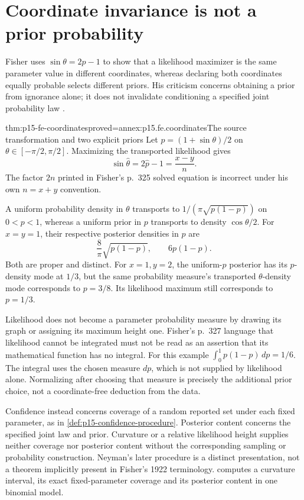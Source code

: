 \section{Coordinate invariance is not a prior probability}

Fisher uses \(\sin\theta=2p-1\) to show that a likelihood
maximizer is the same parameter value in different coordinates, whereas
declaring both coordinates equally probable selects different priors.
His criticism concerns obtaining a prior from ignorance alone; it does
not invalidate conditioning a specified joint probability law
\cite[pp.~324--327]{Fisher1922Foundations}.

\begin{hbtheorem}{thm:p15-fe-coordinates}{proved=annex:p15.fe.coordinates}{The source transformation and two explicit priors}
Let \(p=(1+\sin\theta)/2\) on
\(\theta\in[-\pi/2,\pi/2]\). Maximizing the transported likelihood
gives
\[
              \sin\widehat\theta=2\widehat p-1
                                    =\frac{x-y}{n}.
\]
The factor \(2n\) printed in Fisher's p.~325 solved equation is
incorrect under his own \(n=x+y\) convention.

A uniform probability density in \(\theta\) transports to
\(1/(\pi\sqrt{p(1-p)})\) on \(0<p<1\), whereas a uniform
prior in \(p\) transports to density \(\cos\theta/2\).
For \(x=y=1\), their respective posterior densities in \(p\) are
\[
 \frac8\pi\sqrt{p(1-p)},\qquad 6p(1-p).
\]
Both are proper and distinct. For \(x=1,y=2\), the uniform-\(p\)
posterior has its \(p\)-density mode at \(1/3\), but the same
probability measure's transported \(\theta\)-density mode corresponds
to \(p=3/8\). Its likelihood maximum still corresponds to \(p=1/3\).
\end{hbtheorem}

Likelihood does not become a parameter probability measure by drawing
its graph or assigning its maximum height one. Fisher's p.~327 language
that likelihood cannot be integrated must not be read as an assertion
that its mathematical function has no integral. For this example
\(\int_0^1p(1-p)\,dp=1/6\). The integral uses the chosen measure
\(dp\), which is not supplied by likelihood alone. Normalizing after
choosing that measure is precisely the additional prior choice, not a
coordinate-free deduction from the data.

Confidence instead concerns coverage of a random reported set under
each fixed parameter, as in \cref{def:p15-confidence-procedure}.
Posterior content concerns the specified joint law and prior. Curvature
or a relative likelihood height supplies neither coverage nor posterior
content without the corresponding sampling or probability construction.
Neyman's later procedure is a distinct presentation, not a theorem
implicitly present in Fisher's 1922 terminology.
 computes a curvature
interval, its exact fixed-parameter coverage and its posterior content in
one binomial model.

